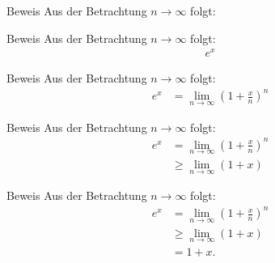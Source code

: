 \documentclass[10pt]{beamer}
\begin{document}
\begin{frame}{Beweis}
    Aus der Betrachtung \( n \to \infty \) folgt:
\end{frame}



\begin{frame}{Beweis}
    Aus der Betrachtung \( n \to \infty \) folgt:
    \begin{align*}
        e^{x}
    \end{align*}
\end{frame}



\begin{frame}{Beweis}
    Aus der Betrachtung \( n \to \infty \) folgt:
    \begin{align*}
        e^{x}
        & = \lim_{n \to \infty} \left( 1 + \frac{x}{n} \right)^{n}
    \end{align*}
\end{frame}



\begin{frame}{Beweis}
    Aus der Betrachtung \( n \to \infty \) folgt:
    \begin{align*}
        e^{x}
        & = \lim_{n \to \infty} \left( 1 + \frac{x}{n} \right)^{n} \\
        & \geq \lim_{n \to \infty} \left( 1 + x \right)
    \end{align*}
\end{frame}



\begin{frame}{Beweis}
    Aus der Betrachtung \( n \to \infty \) folgt:
    \begin{align*}
        e^{x}
        & = \lim_{n \to \infty} \left( 1 + \frac{x}{n} \right)^{n} \\
        & \geq \lim_{n \to \infty} \left( 1 + x \right) \\
        & = 1 + x.
    \end{align*}
\end{frame}
\end{document}
